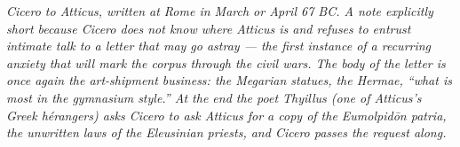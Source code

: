 
\textit{Cicero to Atticus, written at Rome in March or
April 67 BC. A note explicitly short because Cicero does
not know where Atticus is and refuses to entrust intimate
talk to a letter that may go astray --- the first instance
of a recurring anxiety that will mark the corpus through
the civil wars. The body of the letter is once again the
art-shipment business: the Megarian statues, the Hermae,
``what is most in the gymnasium style.'' At the end the
poet Thyillus (one of Atticus's Greek h\'erangers) asks
Cicero to ask Atticus for a copy of the \textit{Eumolpid\=on
patria}, the unwritten laws of the Eleusinian priests, and
Cicero passes the request along.}

